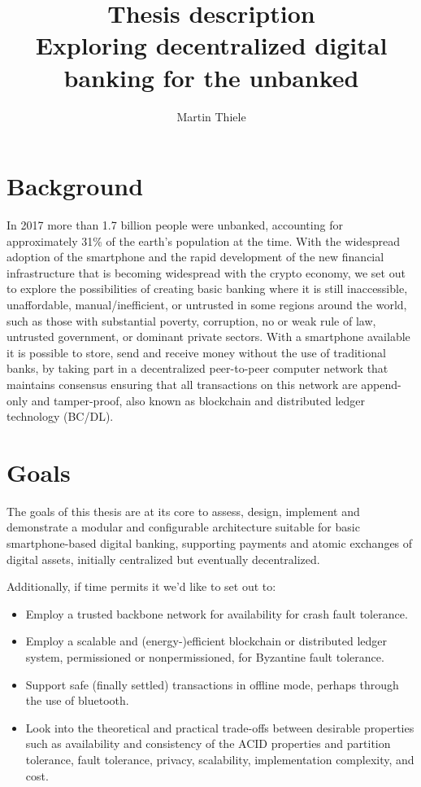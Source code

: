 \documentclass[12pt]{article}
\title{Thesis description \\ \large{Exploring decentralized digital banking for the unbanked}}
\date{\parbox{\linewidth}{\centering%
  \bigskip}
  \endgraf\endgraf\medskip\today\endgraf}
\author{Martin Thiele}
\begin{document}
\maketitle

\section{Background}
In 2017 more than 1.7 billion people were unbanked, accounting for approximately 31\% of the earth's population at the time\cite{findex}. With the widespread adoption of the smartphone and the rapid development of the new financial infrastructure that is becoming widespread with the crypto economy, we set out to explore the possibilities of creating basic banking where it is still inaccessible, unaffordable, manual/inefficient, or untrusted in some regions around the world, such as those with substantial poverty, corruption, no or weak rule of law, untrusted government, or dominant private sectors. With a smartphone available it is possible to store, send and receive money without the use of traditional banks, by taking part in a decentralized peer-to-peer computer network that maintains consensus ensuring that all transactions on this network are append-only and tamper-proof, also known as blockchain and distributed ledger technology (BC/DL).
\section{Goals}
The goals of this thesis are at its core to assess, design, implement and demonstrate a modular and configurable architecture suitable for basic smartphone-based digital banking, supporting payments and atomic exchanges of digital assets, initially centralized but eventually decentralized.

Additionally, if time permits it we'd like to set out to:
\begin{itemize}
    \item Employ a trusted backbone network for availability for crash fault tolerance.
    \item Employ a scalable and (energy-)efficient blockchain or distributed ledger system, permissioned or nonpermissioned, for Byzantine fault tolerance.
    \item Support safe (finally settled) transactions in offline mode, perhaps through the use of bluetooth.
    \item Look into the theoretical and practical trade-offs between desirable properties such as availability and consistency of the ACID properties and partition tolerance, fault tolerance, privacy, scalability, implementation complexity, and cost.
\end{itemize}
\end{document}
